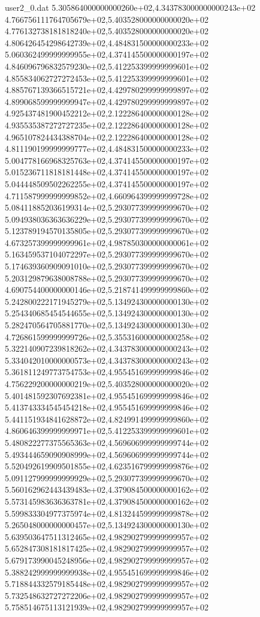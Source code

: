 \begin{filecontents}{user2_0.dat}
5.305864000000000260e+02,4.343783000000000243e+02
4.766756111764705679e+02,5.403528000000000020e+02
4.776132738181818240e+02,5.403528000000000020e+02
4.806426454298642739e+02,4.484831500000000233e+02
5.060362499999999955e+02,4.374145500000000197e+02
4.846096796832579230e+02,5.412253399999999601e+02
4.855834062727272453e+02,5.412253399999999601e+02
4.885767139366515721e+02,4.429780299999999897e+02
4.899068599999999947e+02,4.429780299999999897e+02
4.925437481900452212e+02,2.122286400000000128e+02
4.935535387272727235e+02,2.122286400000000128e+02
4.965107824434388704e+02,2.122286400000000128e+02
4.811190199999999777e+02,4.484831500000000233e+02
5.004778166968325763e+02,4.374145500000000197e+02
5.015236711818181448e+02,4.374145500000000197e+02
5.044448509502262255e+02,4.374145500000000197e+02
4.711587999999999852e+02,4.660964399999999728e+02
5.084118852036199314e+02,5.293077399999999670e+02
5.094938036363636229e+02,5.293077399999999670e+02
5.123789194570135805e+02,5.293077399999999670e+02
4.673257399999999961e+02,4.987850300000000061e+02
5.163459537104072297e+02,5.293077399999999670e+02
5.174639360909091010e+02,5.293077399999999670e+02
5.203129879638008788e+02,5.293077399999999670e+02
4.690754400000000146e+02,5.218741499999999860e+02
5.242800222171945279e+02,5.134924300000000130e+02
5.254340685454544655e+02,5.134924300000000130e+02
5.282470564705881770e+02,5.134924300000000130e+02
4.726861599999999726e+02,5.355316000000000258e+02
5.322140907239818262e+02,4.343783000000000243e+02
5.334042010000000573e+02,4.343783000000000243e+02
5.361811249773754753e+02,4.955451699999999846e+02
4.756229200000000219e+02,5.403528000000000020e+02
5.401481592307692381e+02,4.955451699999999846e+02
5.413743334545454218e+02,4.955451699999999846e+02
5.441151934841628872e+02,4.824991499999999860e+02
4.860646399999999971e+02,5.412253399999999601e+02
5.480822277375565363e+02,4.569606999999999744e+02
5.493444659090908999e+02,4.569606999999999744e+02
5.520492619909501855e+02,4.623516799999999876e+02
5.091127999999999929e+02,5.293077399999999670e+02
5.560162962443439483e+02,4.379084500000000162e+02
5.573145983636363781e+02,4.379084500000000162e+02
5.599833304977375974e+02,4.813244599999999878e+02
5.265048000000000457e+02,5.134924300000000130e+02
5.639503647511312465e+02,4.982902799999999957e+02
5.652847308181817425e+02,4.982902799999999957e+02
5.679173990045248956e+02,4.982902799999999957e+02
5.388242999999999938e+02,4.955451699999999846e+02
5.718844332579185448e+02,4.982902799999999957e+02
5.732548632727272206e+02,4.982902799999999957e+02
5.758514675113121939e+02,4.982902799999999957e+02

\end{filecontents}
